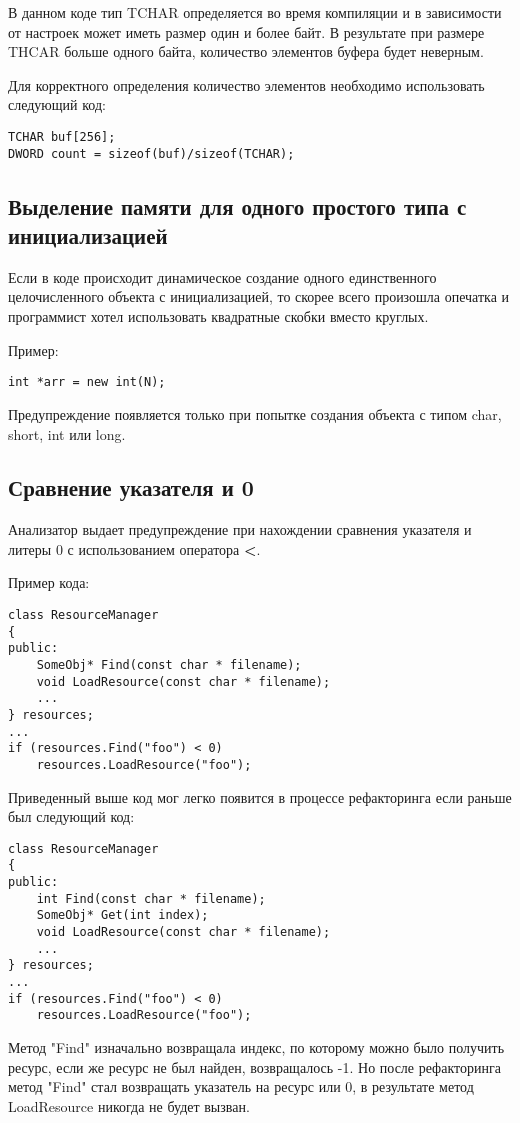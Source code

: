 В данном коде тип TCHAR определяется во время компиляции и в зависимости от настроек
может иметь размер один и более байт. В результате при размере THCAR больше одного байта,
количество элементов буфера будет неверным. 

Для корректного определения количество элементов необходимо использовать следующий код:
\begin{lstlisting}
TCHAR buf[256];
DWORD count = sizeof(buf)/sizeof(TCHAR);
\end{lstlisting}

\subsection{Выделение памяти для одного простого типа с инициализацией}
\label{sec:new}
Если в коде происходит динамическое создание одного единственного целочисленного объекта с
инициализацией, то скорее всего произошла опечатка и программист хотел использовать
квадратные скобки вместо круглых.

Пример:
\begin{lstlisting}
int *arr = new int(N);
\end{lstlisting}

Предупреждение появляется только при попытке создания объекта с типом char, short, int или long.

\subsection{Сравнение указателя и 0}
\label{sec:ptrCmp}
Анализатор выдает предупреждение при нахождении сравнения указателя и литеры 0 с использованием 
оператора \textbf{<}.

Пример кода:
\begin{lstlisting}
class ResourceManager
{
public:
	SomeObj* Find(const char * filename);
	void LoadResource(const char * filename);
	...
} resources;
...
if (resources.Find("foo") < 0)
	resources.LoadResource("foo");
\end{lstlisting}
  
Приведенный выше код мог легко появится в процессе рефакторинга если раньше был следующий код: 
\begin{lstlisting}
class ResourceManager
{
public:
	int Find(const char * filename);
	SomeObj* Get(int index);
	void LoadResource(const char * filename);
	...
} resources;
...
if (resources.Find("foo") < 0)
	resources.LoadResource("foo");
\end{lstlisting}
Метод "Find" изначально возвращала индекс, по которому можно было получить ресурс, если же 
ресурс не был найден, возвращалось -1. Но после рефакторинга метод "Find" стал возвращать указатель на 
ресурс или 0, в результате метод LoadResource никогда не будет вызван.

